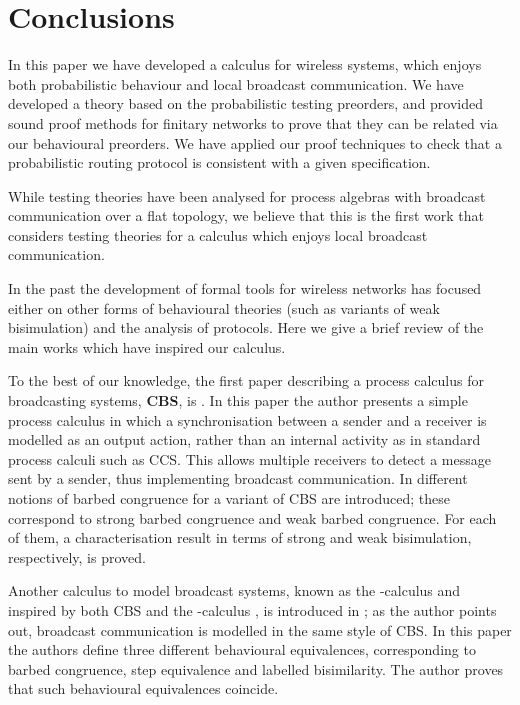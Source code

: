 \documentclass{LMCS}
\begin{document}
\section{Conclusions}
\label{sec:conclusions}

In this paper we have developed a calculus for wireless systems, which enjoys both probabilistic behaviour 
and local broadcast communication. We have developed a theory based on the probabilistic testing preorders, 
and provided sound proof methods for finitary networks to prove that they can be related via our behavioural preorders.
We have applied our proof techniques to check that a probabilistic routing protocol is consistent 
with a given specification.

While testing theories have been analysed for process algebras \cite{Ene02} with broadcast communication 
over a flat topology, we believe that this is the first work that considers testing theories for 
a calculus which enjoys local broadcast communication.

In the past the development of formal tools for wireless networks has focused either on other forms of 
behavioural theories (such as variants of weak bisimulation) and the analysis of protocols. Here we give a brief 
review of the main works which have inspired our calculus.

To the best of our knowledge, the first paper describing a process calculus for broadcasting systems, \textbf{CBS}, is 
\cite{Prasad95}. In this paper the author presents a simple process calculus 
in which a synchronisation between a sender and a receiver is modelled as an 
output action, rather than an internal activity as in standard 
process calculi such as CCS. This allows multiple receivers to detect 
a message sent by a sender, thus implementing broadcast communication. 
In \cite{HenRat98} different notions of barbed congruence for a variant of CBS are introduced; 
these correspond to strong barbed congruence and weak barbed congruence. For each of 
them, a characterisation result in terms of strong and weak bisimulation, 
respectively, is proved. 

Another calculus to model broadcast systems, known as the -calculus 
and inspired by both CBS and the -calculus \cite{pibook}, is introduced in \cite{Ene01}; 
as the author points out, broadcast communication is modelled in the same style of 
CBS. In this paper the authors define three different behavioural equivalences, 
corresponding to barbed congruence, step equivalence and labelled bisimilarity. 
The author proves that such behavioural equivalences coincide. 
\end{document}
